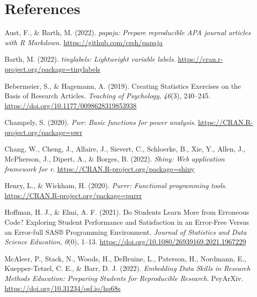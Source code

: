 \documentclass[
  man,floatsintext]{apa6}
\newlength{\cslhangindent}
\newlength{\cslentryspacingunit} %
\newenvironment{CSLReferences}[2] %
 {%
  \setlength{\parindent}{0pt}
  \ifodd #1
  \let\oldpar\par
  \def\par{\hangindent=\cslhangindent\oldpar}
  \fi
  \setlength{\parskip}{#2\cslentryspacingunit}
 }%
 {}
\begin{document}
\hypertarget{references}{%
\section{References}\label{references}}

\hypertarget{refs}{}
\begin{CSLReferences}{1}{0}
\leavevmode{}%
Aust, F., \& Barth, M. (2022). \emph{{papaja}: {Prepare} reproducible {APA} journal articles with {R Markdown}}. \url{https://github.com/crsh/papaja}

\leavevmode{}%
Barth, M. (2022). \emph{{tinylabels}: Lightweight variable labels}. \url{https://cran.r-project.org/package=tinylabels}

\leavevmode{}%
Bebermeier, S., \& Hagemann, A. (2019). Creating {Statistics} {Exercises} on the {Basis} of {Research} {Articles}. \emph{Teaching of Psychology}, \emph{46}(3), 240--245. \url{https://doi.org/10.1177/0098628319853938}

\leavevmode{}%
Champely, S. (2020). \emph{Pwr: Basic functions for power analysis}. \url{https://CRAN.R-project.org/package=pwr}

\leavevmode{}%
Chang, W., Cheng, J., Allaire, J., Sievert, C., Schloerke, B., Xie, Y., Allen, J., McPherson, J., Dipert, A., \& Borges, B. (2022). \emph{Shiny: Web application framework for r}. \url{https://CRAN.R-project.org/package=shiny}

\leavevmode{}%
Henry, L., \& Wickham, H. (2020). \emph{Purrr: Functional programming tools}. \url{https://CRAN.R-project.org/package=purrr}

\leavevmode{}%
Hoffman, H. J., \& Elmi, A. F. (2021). Do {Students} {Learn} {More} from {Erroneous} {Code}? {Exploring} {Student} {Performance} and {Satisfaction} in an {Error}-{Free} {Versus} an {Error}-full {SAS}® {Programming} {Environment}. \emph{Journal of Statistics and Data Science Education}, \emph{0}(0), 1--13. \url{https://doi.org/10.1080/26939169.2021.1967229}

\leavevmode{}%
McAleer, P., Stack, N., Woods, H., DeBruine, L., Paterson, H., Nordmann, E., Kuepper-Tetzel, C. E., \& Barr, D. J. (2022). \emph{Embedding {Data} {Skills} in {Research} {Methods} {Education}: {Preparing} {Students} for {Reproducible} {Research}}. PsyArXiv. \url{https://doi.org/10.31234/osf.io/hq68s}


\end{CSLReferences}
\end{document}
